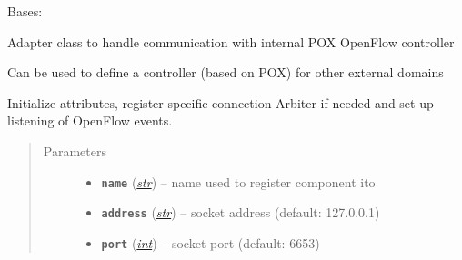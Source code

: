 \documentclass[letterpaper,10pt,english]{sphinxmanual}
\begin{document}
\begin{fulllineitems}
\label{adapt/domain_adapters:escape.adapt.domain_adapters.POXDomainAdapter}
Bases: {\hyperref[util/adapter:escape.util.adapter.AbstractDomainAdapter]{\emph{}}}

Adapter class to handle communication with internal POX OpenFlow controller

Can be used to define a controller (based on POX) for other external domains

\begin{fulllineitems}
\label{adapt/domain_adapters:escape.adapt.domain_adapters.POXDomainAdapter.name}
\end{fulllineitems}


\begin{fulllineitems}
\label{adapt/domain_adapters:escape.adapt.domain_adapters.POXDomainAdapter.__init__}
Initialize attributes, register specific connection Arbiter if needed and
set up listening of OpenFlow events.
\begin{quote}\begin{description}
\item[{Parameters}] \leavevmode\begin{itemize}
\item {} 
\textbf{\texttt{name}} (\href{https://docs.python.org/2.7/library/functions.html\#str}{\emph{str}}) -- name used to register component ito 

\item {} 
\textbf{\texttt{address}} (\href{https://docs.python.org/2.7/library/functions.html\#str}{\emph{str}}) -- socket address (default: 127.0.0.1)

\item {} 
\textbf{\texttt{port}} (\href{https://docs.python.org/2.7/library/functions.html\#int}{\emph{int}}) -- socket port (default: 6653)

\end{itemize}


\end{description}
\end{quote}
\end{fulllineitems}
\end{fulllineitems}
\end{document}
